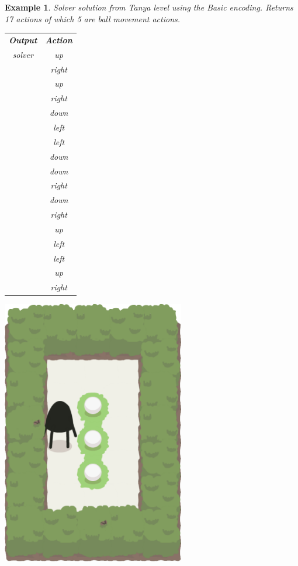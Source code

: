 \documentclass{report}
\theoremstyle{plain}
\newtheorem{example}{Example}[section]
\begin{document}
\begin{example}
\label{ex:tanya-basic}
Solver solution from Tanya level using the \emph{Basic encoding}. Returns 17 actions of which 5 are ball movement actions.

\vspace{1\baselineskip}

\begin{minipage}{0.5\textwidth}
\centering
\begin{tabular}{c|c|}
    \cline{1-2}
    \multicolumn{1}{|c|}{\textbf{Output}} & \textbf{Action} \\
    \cline{1-2}
    \multicolumn{1}{|c|}{solver} & up \\
    \cline{1-1}
    & right \\
    & up \\
    & right \\
    & down \\
    & left \\
    & left \\
    & down \\
    & down \\
    & right \\
    & down \\
    & right \\
    & up \\
    & left \\
    & left \\
    & up \\
    & right \\
    \cline{2-2}
\end{tabular}
\end{minipage}
\begin{minipage}{0.5\textwidth}
\centering
\includegraphics[width=0.6\textwidth]{tanya-1.png}
\end{minipage}
\end{example}
\end{document}
